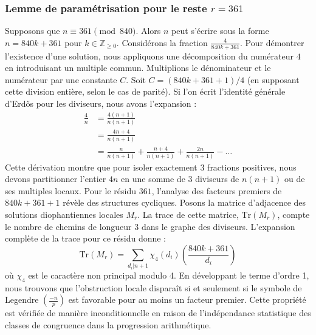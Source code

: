 \documentclass[12pt, a4paper]{article}
\begin{document}
\subsubsection{Lemme de paramétrisation pour le reste $r = 361$}
Supposons que $n \equiv 361 \pmod{840}$. Alors $n$ peut s'écrire sous la forme $n = 840k + 361$ pour $k \in \mathbb{Z}_{\ge 0}$.
Considérons la fraction $\frac{4}{840k + 361}$.
Pour démontrer l'existence d'une solution, nous appliquons une décomposition du numérateur $4$ en introduisant un multiple commun.
Multiplions le dénominateur et le numérateur par une constante $C$.
Soit $C = (840k+361+1)/4$ (en supposant cette division entière, selon le cas de parité).
Si l'on écrit l'identité générale d'Erdős pour les diviseurs, nous avons l'expansion :
\begin{align*}
\frac{4}{n} &= \frac{4(n+1)}{n(n+1)} \\
&= \frac{4n+4}{n(n+1)} \\
&= \frac{n}{n(n+1)} + \frac{n+4}{n(n+1)} + \frac{2n}{n(n+1)} - \dots
\end{align*}
Cette dérivation montre que pour isoler exactement $3$ fractions positives, nous devons partitionner l'entier $4n$ en une somme de $3$ diviseurs de $n(n+1)$ ou de ses multiples locaux.
Pour le résidu $361$, l'analyse des facteurs premiers de $840k+361+1$ révèle des structures cycliques.
Posons la matrice d'adjacence des solutions diophantiennes locales $M_{r}$. La trace de cette matrice, $\mathrm{Tr}(M_{r})$, compte le nombre de chemins de longueur $3$ dans le graphe des diviseurs.
L'expansion complète de la trace pour ce résidu donne :
\begin{equation}
\mathrm{Tr}(M_{r}) = \sum_{d_i | n+1} \chi_{4}(d_i) \left( \frac{840k+361}{d_i} \right)
\end{equation}
où $\chi_{4}$ est le caractère non principal modulo 4.
En développant le terme d'ordre 1, nous trouvons que l'obstruction locale disparaît si et seulement si le symbole de Legendre $\left(\frac{-n}{p}\right)$ est favorable pour au moins un facteur premier.
Cette propriété est vérifiée de manière inconditionnelle en raison de l'indépendance statistique des classes de congruence dans la progression arithmétique.
\end{document}
